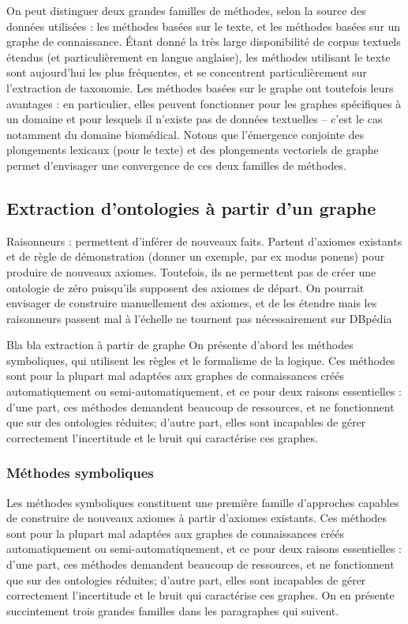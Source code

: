 On peut distinguer deux grandes familles de méthodes, selon la source des données utilisées : les méthodes basées sur le texte, et les méthodes basées sur un graphe de connaissance. Étant donné la très large disponibilité de corpus textuels étendus (et particulièrement en langue anglaise), les méthodes utilisant le texte sont aujourd'hui les plus fréquentes, et se concentrent particulièrement sur l'extraction de taxonomie. Les méthodes basées sur le graphe ont toutefois leurs avantages : en particulier, elles peuvent fonctionner pour les graphes spécifiques à un domaine et pour lesquels il n'existe pas de données textuelles – c'est le cas notamment du domaine biomédical. Notons que l'émergence conjointe des plongements lexicaux (pour le texte) et des plongements vectoriels de graphe permet d'envisager une convergence de ces deux familles de méthodes.


\subsection{Extraction d'ontologies à partir d'un graphe}

Raisonneurs : permettent d'inférer de nouveaux faits. Partent d'axiomes existants et de règle de démonstration (donner un exemple, par ex modus ponens) pour produire de nouveaux axiomes. Toutefois, ils ne permettent pas de créer une ontologie de zéro puisqu'ils supposent des axiomes de départ. On pourrait envisager de construire manuellement des axiomes, et de les étendre mais les raisonneurs passent mal à l'échelle ne tournent pas nécessairement sur DBpédia

Bla bla extraction à partir de graphe
On présente d'abord les méthodes symboliques, qui utilisent les règles et le formalisme de la logique. Ces méthodes sont pour la plupart mal adaptées aux graphes de connaissances créés automatiquement ou semi-automatiquement, et ce pour deux raisons essentielles : d'une part, ces méthodes demandent beaucoup de ressources, et ne fonctionnent que sur des ontologies réduites; d'autre part, elles sont incapables de gérer correctement l'incertitude et le bruit qui caractérise ces graphes. 

\subsubsection{Méthodes symboliques}

Les méthodes symboliques constituent une première famille d'approches capables de construire de nouveaux axiomes à partir d'axiomes existants. Ces méthodes sont pour la plupart mal adaptées aux graphes de connaissances créés automatiquement ou semi-automatiquement, et ce pour deux raisons essentielles : d'une part, ces méthodes demandent beaucoup de ressources, et ne fonctionnent que sur des ontologies réduites; d'autre part, elles sont incapables de gérer correctement l'incertitude et le bruit qui caractérise ces graphes. On en présente succintement trois grandes familles dans les paragraphes qui suivent.

